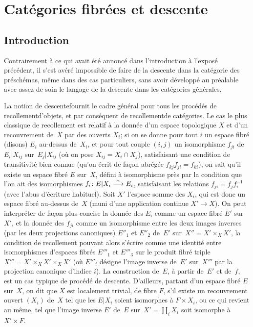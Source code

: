\chapter{Cat\'egories fibr\'ees et descente}
\label{VI}

\setcounter{section}{-1}
\section{Introduction}

Contrairement \`a ce qui avait \'et\'e annonc\'e dans
l'introduction \`a l'expos\'e pr\'ec\'edent, il s'est
av\'er\'e impossible de faire de la descente dans la cat\'egorie
des pr\'esch\'emas, m\^eme dans des cas particuliers, sans avoir
d\'evelopp\'e au pr\'ealable avec assez de soin le langage de la
descente dans les cat\'egories g\'en\'erales.

La notion de \og descente\fg fournit le cadre g\'en\'eral pour tous
les proc\'ed\'es de \og recollement\fg d'objets, et par
cons\'equent de \og recollement\fg de cat\'egories. Le cas le plus
classique de recollement est relatif \`a la donn\'ee d'un espace
topologique $X$ et d'un recouvrement de~$X$ par des ouverts $X_i$; si
on se donne pour tout $i$ un espace fibr\'e (disons) $E_i$ au-dessus
de~$X_i$, et pour tout couple $(i,j)$ un isomorphisme $f_{ji}$ de
$E_i|X_{ij}$ sur~$E_j|X_{ij}$ (o\`u on pose $X_{ij}=X_i\cap X_j$),
satisfaisant une condition de transitivit\'e bien connue (qu'on
\'ecrit de fa\c con abr\'eg\'ee $f_{kj}f_{ji}=f_{ki}$), on
sait qu'il existe un espace fibr\'e $E$ sur~$X$, d\'efini \`a
isomorphisme pr\`es par la condition que l'on ait des isomorphismes
$f_i\colon E|X_i\overset{\sim}{\longrightarrow} E_i$, satisfaisant les relations
$f_{ji}=f_jf_i^{-1}$ (avec l'abus d'\'ecriture habituel). Soit $X'$
l'espace somme des $X_i$, qui est donc un espace fibr\'e au-dessus
de~$X$ (\ie muni d'une application continue $X'\to X$). On peut
interpr\'eter de fa\c con plus concise la donn\'ee des $E_i$
comme un espace fibr\'e $E'$ sur~$X'$, et la donn\'ee des $f_{ji}$
comme un isomorphisme entre les deux images inverses (par les deux
projections canoniques) $E''_1$ et $E''_2$ de~$E'$ sur~$X''=X'\times_X
X'$, la condition de recollement pouvant alors s'\'ecrire comme une
identit\'e entre isomorphismes d'espaces fibr\'es $E'''_1$ et
$E'''_3$ sur le produit fibr\'e triple $X'''=X'\times_X X'\times_X
X'$ (o\`u $E'''_i$ d\'esigne l'image inverse de~$E'$ sur~$X'''$
par la projection canonique d'indice $i$). La construction de~$E$,
\`a partir de~$E'$ et de~$f$, est un cas typique
de proc\'ed\'e de \og descente\fg. D'ailleurs, partant d'un espace
fibr\'e $E$ sur~$X$, on dit que $X$ est \og localement trivial\fg, de
fibre $F$, s'il existe un recouvrement ouvert $(X_i)$ de~$X$ tel que
les $E|X_i$ soient isomorphes \`a $F\times X_i$, ou ce qui revient
au m\^eme, tel que l'image inverse $E'$ de~$E$ sur~$X'=\coprod_i
X_i$ soit isomorphe \`a $X'\times F$.

